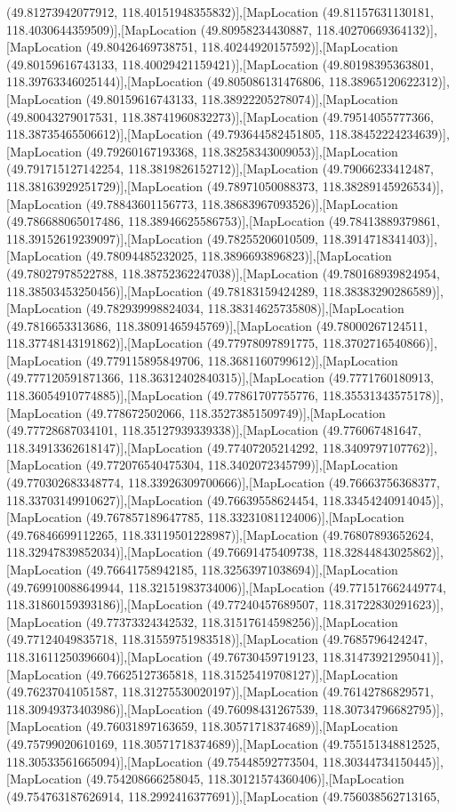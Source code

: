 (49.81273942077912, 118.40151948355832)],[MapLocation (49.81157631130181, 118.4030644359509)],[MapLocation (49.80958234430887, 118.40270669364132)],[MapLocation (49.80426469738751, 118.40244920157592)],[MapLocation (49.80159616743133, 118.40029421159421)],[MapLocation (49.80198395363801, 118.39763346025144)],[MapLocation (49.805086131476806, 118.38965120622312)],[MapLocation (49.80159616743133, 118.38922205278074)],[MapLocation (49.80043279017531, 118.38741960832273)],[MapLocation (49.79514055777366, 118.38735465506612)],[MapLocation (49.793644582451805, 118.38452224234639)],[MapLocation (49.79260167193368, 118.38258343009053)],[MapLocation (49.791715127142254, 118.3819826152712)],[MapLocation (49.79066233412487, 118.38163929251729)],[MapLocation (49.78971050088373, 118.38289145926534)],[MapLocation (49.78843601156773, 118.38683967093526)],[MapLocation (49.786688065017486, 118.38946625586753)],[MapLocation (49.78413889379861, 118.39152619239097)],[MapLocation (49.78255206010509, 118.3914718341403)],[MapLocation (49.78094485232025, 118.3896693896823)],[MapLocation (49.78027978522788, 118.38752362247038)],[MapLocation (49.780168939824954, 118.38503453250456)],[MapLocation (49.78183159424289, 118.38383290286589)],[MapLocation (49.782939998824034, 118.38314625735808)],[MapLocation (49.7816653313686, 118.38091465945769)],[MapLocation (49.78000267124511, 118.37748143191862)],[MapLocation (49.77978097891775, 118.3702716540866)],[MapLocation (49.779115895849706, 118.3681160799612)],[MapLocation (49.777120591871366, 118.36312402840315)],[MapLocation (49.7771760180913, 118.36054910774885)],[MapLocation (49.77861707755776, 118.35531343575178)],[MapLocation (49.778672502066, 118.35273851509749)],[MapLocation (49.77728687034101, 118.35127939339338)],[MapLocation (49.776067481647, 118.34913362618147)],[MapLocation (49.77407205214292, 118.3409797107762)],[MapLocation (49.772076540475304, 118.3402072345799)],[MapLocation (49.770302683348774, 118.33926309700666)],[MapLocation (49.76663756368377, 118.33703149910627)],[MapLocation (49.76639558624454, 118.33454240914045)],[MapLocation (49.767857189647785, 118.33231081124006)],[MapLocation (49.76846699112265, 118.33119501228987)],[MapLocation (49.76807893652624, 118.32947839852034)],[MapLocation (49.76691475409738, 118.32844843025862)],[MapLocation (49.76641758942185, 118.32563971038694)],[MapLocation (49.769910088649944, 118.32151983734006)],[MapLocation (49.771517662449774, 118.31860159393186)],[MapLocation (49.77240457689507, 118.31722830291623)],[MapLocation (49.77373324342532, 118.31517614598256)],[MapLocation (49.77124049835718, 118.31559751983518)],[MapLocation (49.7685796424247, 118.31611250396604)],[MapLocation (49.76730459719123, 118.31473921295041)],[MapLocation (49.76625127365818, 118.31525419708127)],[MapLocation (49.76237041051587, 118.31275530020197)],[MapLocation (49.76142786829571, 118.30949373403986)],[MapLocation (49.76098431267539, 118.30734796682795)],[MapLocation (49.76031897163659, 118.30571718374689)],[MapLocation (49.75799020610169, 118.30571718374689)],[MapLocation (49.755151348812525, 118.30533561665094)],[MapLocation (49.75448592773504, 118.30344734150445)],[MapLocation (49.754208666258045, 118.30121574360406)],[MapLocation (49.754763187626914, 118.2992416377691)],[MapLocation (49.756038562713165, 